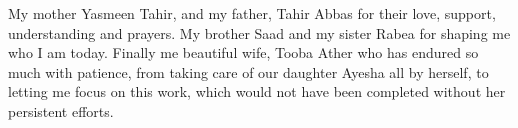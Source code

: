 My mother Yasmeen Tahir, and my father, Tahir Abbas for their love, support, understanding and prayers. My brother Saad and my sister Rabea for shaping me who I am today. Finally me beautiful wife, Tooba Ather who has endured so much with patience, from taking care of our daughter Ayesha all by herself, to letting me focus on this work, which would not have been completed without her persistent efforts.

\pagebreak{}
